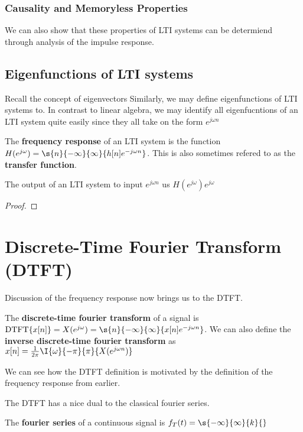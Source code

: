 \documentclass{report}
\begin{document}
\subsubsection{Causality and Memoryless Properties}
We can also show that these properties of LTI systems can be determiend through analysis of the impulse response.

\subsection{Eigenfunctions of LTI systems}
Recall the concept of eigenvectors
Similarly, we may define eigenfunctions of LTI systems to. In contrast to linear algebra, we may identify all eigenfucntions of an LTI system quite easily since they all take on the form $e^{j \omega n}$
\begin{definition}
    The \textbf{frequency response} of an LTI system is the function $H(e^{j \omega}) = \s{n}{-\infty}{\infty}{h[n] e^{-j \omega n}}$. This is also sometimes refered to as the \textbf{transfer function}.
\end{definition}
\begin{theorem}
    The output of an LTI system to input $e^{j \omega n}$ us $H(e^{j\omega}) e^{j\omega}$
\end{theorem}
\begin{proof}
\end{proof}
\section{Discrete-Time Fourier Transform (DTFT)}
Discussion of the frequency response now brings us to the DTFT. 
\begin{definition}
    The \textbf{discrete-time fourier transform} of a signal is $\mathrm{DTFT}\{x[n]\} = X(e^{j\omega}) = \s{n}{-\infty}{\infty}{x[n] e^{-j\omega n}}$. We can also define the \textbf{inverse discrete-time fourier transform} as $x[n] = \frac{1}{2 \pi} \I{\omega}{-\pi}{\pi}{X(e^{j\omega n})}$
\end{definition}
We can see how the DTFT definition is motivated by the definition of the frequency response from earlier.

The DTFT has a nice dual to the classical fourier series.
\begin{definition}
    The \textbf{fourier series} of a continuous signal is $f_{T}(t) = \s{-\infty}{\infty}{k}{}$
\end{definition}
 
\end{document}
